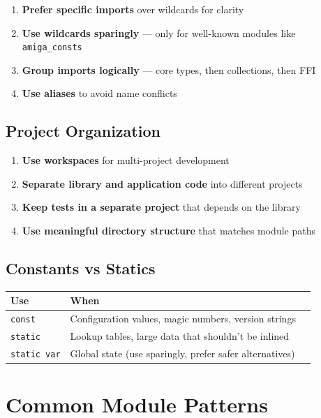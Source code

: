 \begin{enumerate}
    \item \textbf{Prefer specific imports} over wildcards for clarity
    \item \textbf{Use wildcards sparingly} --- only for well-known modules like \texttt{amiga\_consts}
    \item \textbf{Group imports logically} --- core types, then collections, then FFI
    \item \textbf{Use aliases} to avoid name conflicts
\end{enumerate}

\subsection{Project Organization}
\label{subsec:project-org}

\begin{enumerate}
    \item \textbf{Use workspaces} for multi-project development
    \item \textbf{Separate library and application code} into different projects
    \item \textbf{Keep tests in a separate project} that depends on the library
    \item \textbf{Use meaningful directory structure} that matches module paths
\end{enumerate}

\subsection{Constants vs Statics}
\label{subsec:const-vs-static}

\begin{center}
\begin{tabular}{lll}
\textbf{Use} & \textbf{When} \\
\hline
\texttt{const} & Configuration values, magic numbers, version strings \\
\texttt{static} & Lookup tables, large data that shouldn't be inlined \\
\texttt{static var} & Global state (use sparingly, prefer safer alternatives) \\
\end{tabular}
\end{center}

\section{Common Module Patterns}
\label{sec:module-patterns}

